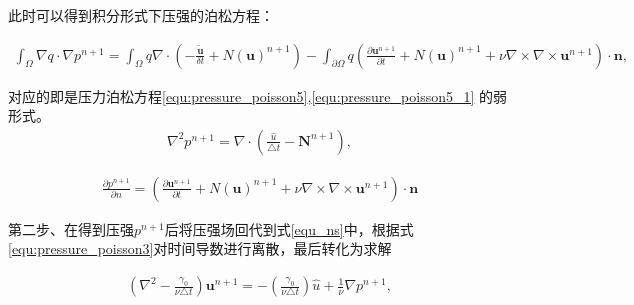 此时可以得到积分形式下压强的泊松方程：

\begin{equation}
    \begin{aligned}
\int_{\Omega}\nabla q\cdot \nabla p^{n+1} = \int_{\Omega}q\nabla \cdot(-\frac{\tilde{\bm u}}{\delta t}+N(\bm u)^{n+1}) - \int_{\partial \Omega}q(\frac{\partial \bm u^{n+1}}{\partial t} + N(\bm u)^{n+1} + \nu\nabla \times \nabla \times \bm u^{n+1}) \cdot \bm n,
\end{aligned}
\label{equ:pressure_poisson4}
\end{equation}

对应的即是压力泊松方程\ref{equ:pressure_poisson5},\ref{equ:pressure_poisson5_1} 的弱形式。
\begin{equation}
\begin{aligned}
\nabla^{2}p^{n+1} = \nabla \cdot (\frac{\hat{u}}{\triangle t} - \bm N^{n+1}),
\end{aligned}
\label{equ:pressure_poisson5}
\end{equation}

\begin{equation}
\begin{aligned}
\frac{\partial p^{n+1}}{\partial n} = (\frac{\partial \bm u^{n+1}}{\partial t} + N(\bm u)^{n+1} + \nu\nabla \times \nabla \times \bm u^{n+1}) \cdot \bm n
\end{aligned}
\label{equ:pressure_poisson5_1}
\end{equation}

第二步、在得到压强$p^{n+1}$后将压强场回代到式\ref{equ_ns}中，根据式\ref{equ:pressure_poisson3}对时间导数进行离散，最后转化为求解

\begin{equation}
\begin{aligned}
(\nabla^{2} - \frac{\gamma_{0}}{\nu\triangle t}) \bm u^{n+1} = -(\frac{\gamma_{0}}{\nu\triangle t})\hat{u} + \frac{1}{\nu}\nabla p^{n+1},
\end{aligned}
\end{equation}

